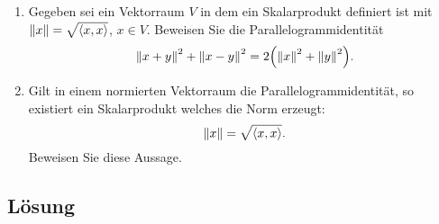\documentclass[german,12pt]{homework}
\newcommand{\dotproduct}[2]{\left\langle#1, #2\right\rangle}
\DeclarePairedDelimiter{\norm}{\lVert}{\rVert}
\DeclarePairedDelimiter{\enbrace}{(}{)}
\begin{document}
    \begin{problem}
        \begin{enumerate}
            \item Gegeben sei ein Vektorraum \(V\) in dem ein Skalarprodukt
            definiert ist mit \(\norm*{x} = \sqrt{\dotproduct{x}{x}}\), \(x \in
            V\). Beweisen Sie die Parallelogrammidentität
            \[\norm*{x + y}^2 + \norm*{x - y}^2 = 2\enbrace*{\norm*{x}^2 +
            \norm*{y}^2}.\]
            \item Gilt in einem normierten Vektorraum die
            Parallelogrammidentität, so existiert ein Skalarprodukt welches die
            Norm erzeugt:
            \[\norm*{x} = \sqrt{\dotproduct{x}{x}}.\]
            Beweisen Sie diese Aussage.
        \end{enumerate}
    \end{problem}

    \subsection*{Lösung}
\end{document}
